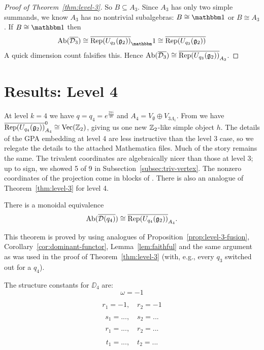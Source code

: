 \begin{proof}[Proof of Theorem~\ref{thm:level-3}]
    So $B\subseteq A_3$. Since $A_3$ has only two simple summands, we know $A_3$ has no nontrivial subalgebras: $B\cong \unit$ or $B\cong A_3$.
    If $B\cong \unit$ then
    \[
        \Ab(\ol{\DD_3}) \cong \ol{\Rep(U_{q_3}(\gg_2))}_\unit \cong \ol{\Rep(U_{q_3}(\gg_2))}
    \]
    A quick dimension count falsifies this. Hence $\operatorname{Ab}(\overline{\mathcal{D}_3}) \cong \overline{ \operatorname{Rep}(U_{q_3}(\mathfrak{g}_2))}_{A_3}$.
\end{proof}








\section{Results: Level 4}
At level $k=4$ we have $q = q_4 = e^{\frac{2\pi i}{48}}$ and $A_4=V_\emptyset \oplus V_{3\Lambda_1}$. From \cite{DMNO} we have $\overline{\operatorname{Rep}(U_{q_4}(\mathfrak{g}_2))}_{A_4}^0 \cong \operatorname{Vec}(\mathbb{Z}_2)$, giving us one new $\mathbb{Z}_2$-like simple object $h$. The details of the GPA embedding at level 4 are less instructive than the level 3 case, so we relegate the details to the attached Mathematica files. Much of the story remains the same. The trivalent coordinates are algebraically nicer than those at level 3; up to sign, we showed 5 of 9 in Subsection~\ref{subsec:triv-vertex}. The nonzero coordinates of the projection come in blocks of . There is also an analogue of Theorem~\ref{thm:level-3} for level 4.

\begin{theorem}\label{thm:level-4}
    There is a monoidal equivalence
    \[
        \operatorname{Ab}(\overline{\mathcal{D}(q_4)}) \cong \overline{ \operatorname{Rep}(U_{q_4}(\mathfrak{g}_2))}_{A_4}.
    \]
\end{theorem}

This theorem is proved by using analogues of Proposition~\ref{prop:level-3-fusion}, Corollary~\ref{cor:dominant-functor}, Lemma~\ref{lem:faithful} and the same argument as was used in the proof of Theorem~\ref{thm:level-3} (with, e.g., every $q_3$ switched out for a $q_4$).

The structure constants for $\DD_4$ are:
\begin{equation*}
    \omega = -1
\end{equation*}

\begin{equation*}
    r_1 = -1, \quad r_2 = -1
\end{equation*}

\begin{equation*}
    s_1 = ..., \quad s_2 = ...
\end{equation*}

\begin{equation*}
    r_1 = ..., \quad r_2 = ...
\end{equation*}

\begin{equation*}
    t_1 = ..., \quad t_2 = ...
\end{equation*}






